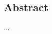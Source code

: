 \documentclass[
    a4paper, %
	fontsize=10pt, %
	twoside=false, %
]{kaobook}
\begin{document}
\begin{titlepage}






\chapter*{Abstract}

...


\begingroup %

\setlength{\textheight}{230\vscale} %

\etocstandarddisplaystyle %
\etocstandardlines %

\tableofcontents %



\end{titlepage}
\end{document}
